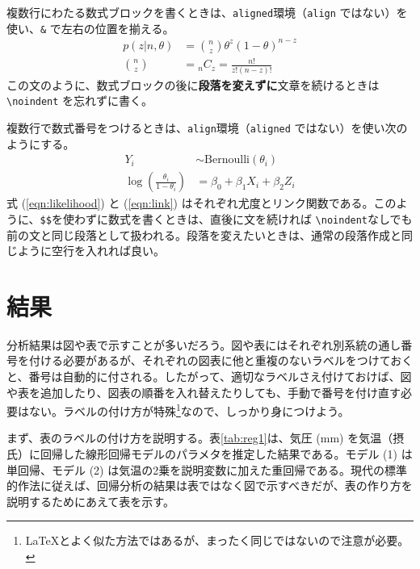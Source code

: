 \documentclass[10.5pt,a4paper,lualatex,ja=standard]{bxjsarticle}
\begin{document}
複数行にわたる数式ブロックを書くときは、\texttt{aligned}環境（\texttt{align} ではない）を使い、\texttt{\&} で左右の位置を揃える。
\[
\begin{aligned}
  p(z | n, \theta) &= \binom{n}{z} \theta^{z} (1 - \theta)^{n - z}\\
  \binom{n}{z} &= {}_n C_z = \frac{n!}{z! (n - z)!}
\end{aligned}
\]
\noindent この文のように、数式ブロックの後に\textbf{段落を変えずに}文章を続けるときは \texttt{\textbackslash{}noindent} を忘れずに書く。

複数行で数式番号をつけるときは、\texttt{align}環境（\texttt{aligned} ではない）を使い次のようにする。
\begin{align}
  Y_i &\sim \mbox{Bernoulli}(\theta_i)  \label{eqn:likelihood} \\
  \log \left( \frac{\theta_i}{1 - \theta_i} \right) &=  \beta_0 + \beta_1 X_{i} + \beta_2 Z_{i} \label{eqn:link}
\end{align}
式 (\ref{eqn:likelihood}) と (\ref{eqn:link}) はそれぞれ尤度とリンク関数である。このように、\texttt{\$\$}を使わずに数式を書くときは、直後に文を続ければ \texttt{\textbackslash{}noindent}なしでも前の文と同じ段落として扱われる。段落を変えたいときは、通常の段落作成と同じように空行を入れれば良い。

\section{結果}\label{ux7d50ux679c}

分析結果は図や表で示すことが多いだろう。図や表にはそれぞれ別系統の通し番号を付ける必要があるが、それぞれの図表に他と重複のないラベルをつけておくと、番号は自動的に付される。したがって、適切なラベルさえ付けておけば、図や表を追加したり、図表の順番を入れ替えたりしても、手動で番号を付け直す必要はない。ラベルの付け方が特殊\footnote{\LaTeX  とよく似た方法ではあるが、まったく同じではないので注意が必要。}なので、しっかり身につけよう。

まず、表のラベルの付け方を説明する。表\ref{tab:reg1}は、気圧 (mm) を気温（摂氏）に回帰した線形回帰モデルのパラメタを推定した結果である。モデル (1) は単回帰、モデル (2) は気温の2乗を説明変数に加えた重回帰である。現代の標準的作法に従えば、回帰分析の結果は表ではなく図で示すべきだが、表の作り方を説明するためにあえて表を示す。
\end{document}
